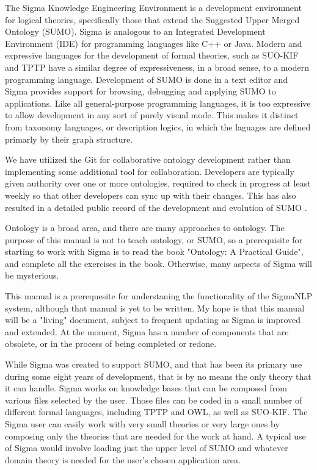 \documentclass{book}
\begin{document}
The Sigma Knowledge Engineering Environment is a development environment for
logical theories, specifically those that extend the Suggested Upper Merged
Ontology (SUMO).  Sigma is analogous to an Integrated Development Environment
(IDE) for programming languages like C++ or Java.  Modern and expressive
languages for the development of formal theories, such as SUO-KIF
\cite{Pease2009} and TPTP \cite{Sutcliffe:JAR-2009} have a similar
degree of expressiveness, in a broad sense, to a modern programming language.
Development of SUMO is done in a text editor and Sigma provides support for
browsing, debugging and applying SUMO to applications.  Like all general-purpose
programming languages, it is too expressive to allow development in any sort of
purely visual mode.  This makes it distinct from taxonomy languages, or
description logics, in which the laguages are defined primarly by their graph
structure.

We have utilized the Git for collaborative ontology development
rather than implementing some additional tool for collaboration. Developers are
typically given authority over one or more ontologies, required to check in
progress at least weekly so that other developers can sync up with their
changes.  This has also resulted in a detailed public record of the development
and evolution of SUMO \cite{pb10}.

Ontology is a broad area, and there are many approaches to ontology.  The purpose 
of this manual is not to teach ontology, or SUMO, so a prerequisite for starting
to work with Sigma is to read the book "Ontology: A Practical Guide", and complete
all the exercises in the book.  Otherwise, many aspects of Sigma will be 
mysterious.

This manual is a prerequesite for understaning the functionality of the SigmaNLP
system, although that manual is yet to be written. My hope is that this manual
will be a "living" document, subject to frequent updating as Sigma is improved and
extended.  At the moment, Sigma has a number of components that are obsolete, or
in the process of being completed or redone.

While Sigma \cite{SigmaWeb} \cite{p03} was created to support SUMO, and that has
been its primary use during some eight years of development, that is by no means
the only theory that it can handle.  Sigma works on knowledge bases that can be
composed from various files selected by the user.  Those files can be coded in a
small number of different formal languages, including TPTP and OWL, as well as
SUO-KIF.  The Sigma user can easily work with very small theories or very large
ones by composing only the theories that are needed for the work at hand.  A
typical use of Sigma would involve loading just the upper level of SUMO and
whatever domain theory is needed for the user's chosen application area.
\end{document}
